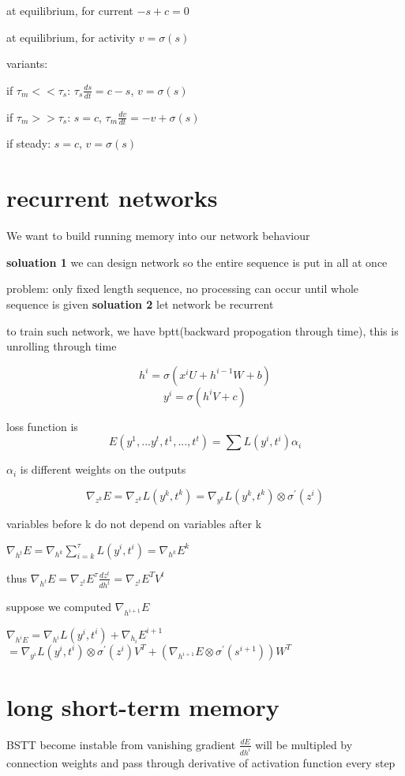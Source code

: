 \documentclass[10pt]{article}
\theoremstyle{break}
\begin{document}
at equilibrium, for current
$-s+c=0$

at equilibrium, for activity $v=\sigma(s)$

variants: 

if $\tau_m<<\tau_s$: $\tau_s\frac{ds}{dt}=c-s$, $v=\sigma(s)$

if $\tau_m>>\tau_s$: $s=c$, $\tau_m\frac{dv}{dt}=-v+\sigma(s)$

if steady: $s=c$, $v=\sigma(s)$

\section{recurrent networks}
We want to build running memory into our network behaviour

\textbf{soluation 1}
we can design network so the entire sequence is put in all at once

problem: only fixed length sequence, no processing can occur until whole sequence is given
\textbf{soluation 2}
let network be recurrent 

to train such network, we have bptt(backward propogation through time), this is unrolling through time

$$h^i = \sigma(x^i U + h^{i-1}W +b)$$
$$y^i = \sigma(h^iV+c)$$

loss function is $$E(y^1, ... y^t, t^1,...,t^t)=\sum L(y^i, t^i)\alpha_i$$

$\alpha_i$ is different weights on the outputs 

$$\nabla_{z^k}E = \nabla_{z^k}L(y^k,t^k)=\nabla_{y^k}L(y^k, t^k)\otimes\sigma^{'}(z^i)$$

variables before k do not depend on variables after k

$\nabla_{h^t}E = \nabla_{h^k} \sum_{i=k}^\tau L(y^i, t^i) = \nabla _{ h^k}E ^k$

thus $\nabla_{h^t}E = \nabla_{z^t}E^\tau\frac{dz^t}{dh^t}=\nabla_{z^t}E^T V^t$

suppose we computed $\nabla_{h^{i+1}}E$

$\nabla_{h^iE}=\nabla_{h^i}L(y^i, t^i) + \nabla_{h_i} E^{i+1}$
$=\nabla_{y^i} L(y^i, t^i)\otimes\sigma^{'}(z^i)V^T + (\nabla_{h^{i+1}}E \otimes \sigma^{'}(s^{i+1}))W^T$

\section{long short-term memory}
BSTT become instable from vanishing gradient
$\frac{dE}{dh^i}$ will be multipled by connection weights and pass through derivative of activation function every step
\end{document}
